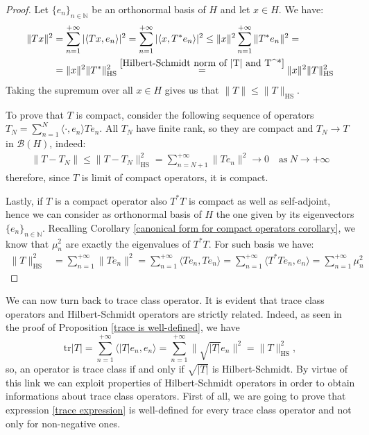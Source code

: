 \documentclass[corpo=11pt, stile=classica, tipotesi=custom,
greek, evenboxes, english]{toptesi}
\numberwithin{equation}{chapter}
\theoremstyle{remark}
\newcommand{\N}{\mathbb{N}} %
\newcommand{\B}{\mathscr{B}} %
\begin{document}
\begin{proof}
	Let $\{e_n\}_{n \in \N}$ be an orthonormal basis of $H$ and let $x \in H$. We have:
	\begin{align*}
		\|Tx\|^2 &= \sum_{n=1}^{+\infty} |\langle Tx,e_n \rangle|^2 = \sum_{n=1}^{+\infty} |\langle x,T^*e_n \rangle|^2 \leq \|x\|^2 \sum_{n=1}^{+\infty} \|T^*e_n\|^2 =\\
				 &= \|x\|^2 \|T^*\|_{\mathrm{HS}}^2 \overset{\eqref{Hilbert-Schmidt norm of |T| and T^*}}{=} \|x\|^2 \|T\|_{\mathrm{HS}}^2
	\end{align*}
	Taking the supremum over all $x \in H$ gives us that $\|T\| \leq \|T\|_{\mathrm{HS}}$.
	
	To prove that $T$ is compact, consider the following sequence of operators $T_N = \sum_{n=1}^{N} \langle \cdot , e_n \rangle Te_n$. All $T_N$ have finite rank, so they are compact and $T_N \rightarrow T$ in $\B(H)$, indeed:
	\begin{align*}
		\|T-T_N\| \leq \|T-T_N\|_{\mathrm{HS}}^2 = \sum_{n=N+1}^{+\infty} \|T e_n\|^2 \rightarrow 0 \quad \mathrm{as\ } N \rightarrow +\infty
	\end{align*}
	therefore, since $T$ is limit of compact operators, it is compact.
	
	Lastly, if $T$ is a compact operator also $T^*T$ is compact as well as self-adjoint, hence we can consider as orthonormal basis of $H$ the one given by its eigenvectors $\{e_n\}_{n \in \N}$. Recalling Corollary \ref{canonical form for compact operators corollary}, we know that $\mu_n^2$ are exactly the eigenvalues of $T^*T$.  For such basis we have:
	\begin{align*}
		\|T\|_{\mathrm{HS}}^2 &= \sum_{n=1}^{+\infty} \|Te_n\|^2 = \sum_{n=1}^{+\infty} \langle Te_n,Te_n \rangle = \sum_{n=1}^{+\infty} \langle T^*T e_n,e_n \rangle = \sum_{n=1}^{+\infty} \mu_n^2
	\end{align*}
\end{proof}
We can now turn back to trace class operator. It is evident that trace class operators and Hilbert-Schmidt operators are strictly related. Indeed, as seen in the proof of Proposition \ref{trace is well-defined}, we have
\begin{equation*}
	\mathrm{tr}|T| = \sum_{n=1}^{+\infty} \langle |T|e_n, e_n \rangle = \sum_{n=1}^{+\infty} \|\sqrt{|T|}e_n\|^2 = \| T \|_{\mathrm{HS}}^2,
\end{equation*}
so, an operator is trace class if and only if $\sqrt{|T|}$ is Hilbert-Schmidt. By virtue of this link we can exploit properties of Hilbert-Schmidt operators in order to obtain informations about trace class operators. First of all, we are going to prove that expression \eqref{trace expression} is well-defined for every trace class operator and not only for non-negative ones.
\end{document}
